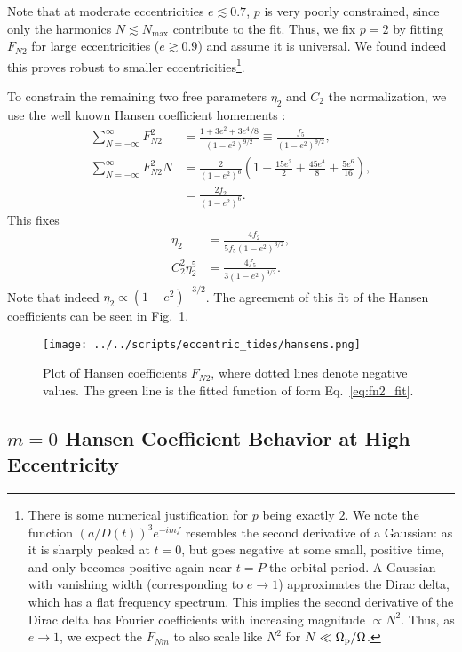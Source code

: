 \documentclass[
        fleqn,
        usenatbib,
        referee,
    ]{mnras}
\newcommand*{\p}[1]{\left(#1\right)}
\begin{document}
Note that at moderate eccentricities $e \lesssim 0.7$, $p$ is very poorly
constrained, since only the harmonics $N \lesssim N_{\max}$ contribute to the
fit. Thus, we fix $p = 2$ by fitting $F_{N2}$ for large eccentricities ($e
\gtrsim 0.9$) and assume it is universal. We found indeed this proves robust to
smaller eccentricities\footnote{There is some numerical justification for $p$
being exactly $2$. We note the function $\p{a/D(t)}^3e^{-imf}$ resembles the
second derivative of a Gaussian: as it is sharply peaked at $t = 0$, but goes
negative at some small, positive time, and only becomes positive again near $t =
P$ the orbital period. A Gaussian with vanishing width (corresponding to $e \to
1$) approximates the Dirac delta, which has a flat frequency spectrum. This
implies the second derivative of the Dirac delta has Fourier coefficients with
increasing magnitude $\propto N^2$. Thus, as $e \to 1$, we expect the $F_{Nm}$
to also scale like $N^2$ for $N \ll \Omega_{\rm p} / \Omega$.}.

To constrain the remaining two free parameters $\eta_2$ and $C_2$ the
normalization, we use the well known Hansen coefficient homements
\citep{hut81,sl,vlf}:
\begin{align}
    \sum\limits_{N = -\infty}^\infty F_{N2}^2
        &= \frac{1 + 3e^2 + 3e^4/8}{\p{1 - e^2}^{9/2}}
            \equiv \frac{f_5}{\p{1 - e^2}^{9/2}},\\
    \sum\limits_{N = -\infty}^\infty F_{N2}^2N
        &= \frac{2}{\p{1 - e^2}^6}\p{1 + \frac{15e^2}{2}
            + \frac{45 e^4}{8} + \frac{5e^6}{16}},\\
        &= \frac{2f_2}{\p{1 - e^2}^6}.
\end{align}
This fixes
\begin{align}
    \eta_2 &= \frac{4f_2}{5f_5\p{1 - e^2}^{3/2}},\\
    C_2^2\eta_2^5 &= \frac{4f_5}{3\p{1 - e^2}^{9/2}}.
\end{align}
Note that indeed $\eta_2 \propto \p{1 - e^2}^{-3/2}$. The agreement of this fit
of the Hansen coefficients can be seen in Fig.~\ref{fig:hansens}.
\begin{figure}
    \centering
    \texttt{[image: ../../scripts/eccentric\_tides/hansens.png]}
    \caption{Plot of Hansen coefficients $F_{N2}$, where dotted lines denote
    negative values. The green line is the fitted function of form
    Eq.~\eqref{eq:fn2_fit}.}\label{fig:hansens}
\end{figure}

\subsection{$m = 0$ Hansen Coefficient Behavior at High Eccentricity}
\end{document}

